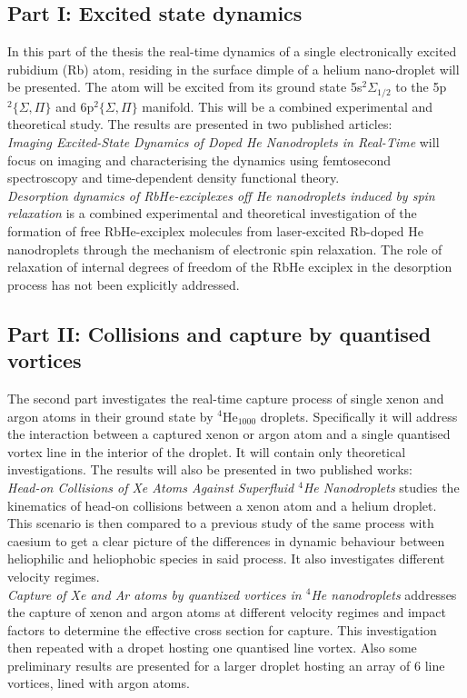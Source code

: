 \documentclass[11pt,a4paper,twoside]{article}
\begin{document}
		\subsection{Part I: Excited state dynamics}
			In this part of the thesis the real-time dynamics of a single electronically excited rubidium (Rb) atom, residing in the surface dimple of a helium nano-droplet will be presented. The atom will be excited from its ground state 5s$^2\Sigma_{1/2}$ to the 5p$^2\{\Sigma,\Pi\}$ and 6p$^2\{\Sigma,\Pi\}$ manifold. This will be a combined experimental and theoretical study. The results are presented in two published articles:\\
		
			\emph{Imaging Excited-State Dynamics of Doped He Nanodroplets in Real-Time} will focus on imaging and characterising the dynamics using femtosecond spectroscopy and  time-dependent density functional theory.\\
		
			\emph{Desorption dynamics of RbHe-exciplexes off He nanodroplets induced by spin relaxation} is a combined experimental and theoretical investigation of the formation of free RbHe-exciplex molecules from laser-excited Rb-doped He nanodroplets through the mechanism of electronic spin relaxation. The role of relaxation of internal degrees of freedom of the RbHe exciplex in the desorption process has not been explicitly addressed.

		\subsection{Part II: Collisions and capture by quantised vortices}
			The second part investigates the real-time capture process of single xenon and argon atoms in their ground state by $^4$He$_{1000}$ droplets. Specifically it will address the interaction between a captured xenon or argon atom and a single quantised vortex line in the interior of the droplet. It will contain only theoretical investigations. The results will also be presented in two published works:\\
		
			\emph{Head-on Collisions of Xe Atoms Against Superfluid $^4\!$He Nanodroplets} studies the kinematics of head-on collisions between a xenon atom and a helium droplet. This scenario is then compared to a previous study of the same process with caesium to get a clear picture of the differences in dynamic behaviour between heliophilic and heliophobic species in said process. It also investigates different velocity regimes.\\
		
			\emph{Capture of Xe and Ar atoms by quantized vortices in $^4\!$He nanodroplets} addresses the capture of xenon and argon atoms at different velocity regimes and impact factors to determine the effective cross section for capture. This investigation then repeated with a dropet hosting one quantised line vortex. Also some preliminary results are presented for a larger droplet hosting an array of 6 line vortices, lined with argon atoms.
			

\end{document}
